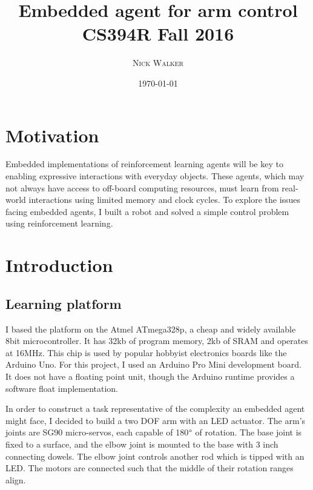 \documentclass{article}
\title{Embedded agent for arm control \\ \large CS394R Fall 2016} %
\author{\textsc{Nick Walker}} %
\date{\today} %
\begin{document}
	
	\maketitle %
	
	
	
	\section{Motivation}
	
	Embedded implementations of reinforcement learning agents will be key to enabling expressive interactions with everyday objects. These agents, which may not always have access to off-board computing resources, must learn from real-world interactions using limited memory and clock cycles. To explore the issues facing embedded agents, I built a robot and solved a simple control problem using reinforcement learning.
	
	
	
	\section{Introduction}
	
	\subsection{Learning platform}
	
	I based the platform on the Atmel ATmega328p, a cheap and widely available 8bit microcontroller. It has 32kb of program memory, 2kb of SRAM and operates at 16MHz. This chip is used by popular hobbyist electronics boards like the Arduino Uno. For this project, I used an Arduino Pro Mini development board. It does not have a floating point unit, though the Arduino runtime provides a software float implementation.
	
	In order to construct a task representative of the complexity an embedded agent might face, I decided to build a two DOF arm with an LED actuator. The arm's joints are SG90 micro-servos, each capable of 180$\degree$ of rotation. The base joint is fixed to a surface, and the elbow joint is mounted to the base with 3 inch connecting dowels. The elbow joint controls another rod which is tipped with an LED. The motors are connected such that the middle of their rotation ranges align.
	
\end{document}
